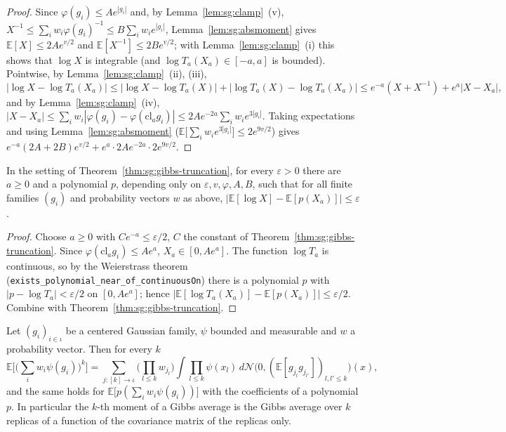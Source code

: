 \begin{proof}
  \leanok
Since $\varphi(g_i)\le Ae^{|g_i|}$ and, by Lemma~\ref{lem:sg:clamp}~(v), $X^{-1}\le\sum_iw_i\varphi(g_i)^{-1}\le B\sum_iw_ie^{|g_i|}$, Lemma~\ref{lem:sg:absmoment} gives
$\mathbb E[X]\le2Ae^{v/2}$ and $\mathbb E[X^{-1}]\le2Be^{v/2}$; with Lemma~\ref{lem:sg:clamp}~(i) this shows that $\log X$ is integrable (and $\log T_a(X_a)\in[-a,a]$ is bounded).
Pointwise, by Lemma~\ref{lem:sg:clamp}~(ii), (iii),
\[|\log X-\log T_a(X_a)|\le|\log X-\log T_a(X)|+|\log T_a(X)-\log T_a(X_a)|\le e^{-a}(X+X^{-1})+e^a|X-X_a|,\]
and by Lemma~\ref{lem:sg:clamp}~(iv), $|X-X_a|\le\sum_iw_i|\varphi(g_i)-\varphi(\mathrm{cl}_ag_i)|\le2Ae^{-2a}\sum_iw_ie^{3|g_i|}$. Taking expectations and using
Lemma~\ref{lem:sg:absmoment} ($\mathbb E\big[\sum_iw_ie^{3|g_i|}\big]\le2e^{9v/2}$) gives $e^{-a}(2A+2B)e^{v/2}+e^a\cdot2Ae^{-2a}\cdot2e^{9v/2}$.
\end{proof}

\begin{theorem}\label{thm:sg:poly}
  \leanok
In the setting of Theorem~\ref{thm:sg:gibbs-truncation}, for every $\varepsilon>0$ there are $a\ge0$ and a polynomial $p$, depending only on $\varepsilon,v,\varphi,A,B$, such that
for all finite families $(g_i)$ and probability vectors $w$ as above, $|\mathbb E[\log X]-\mathbb E[p(X_a)]|\le\varepsilon$.
\end{theorem}

\begin{proof}
  \leanok
Choose $a\ge0$ with $Ce^{-a}\le\varepsilon/2$, $C$ the constant of Theorem~\ref{thm:sg:gibbs-truncation}. Since $\varphi(\mathrm{cl}_ag_i)\le Ae^a$, $X_a\in[0,Ae^a]$. The function $\log T_a$ is continuous,
so by the Weierstrass theorem (\texttt{exists\_polynomial\_near\_of\_continuousOn}) there is a polynomial $p$ with $|p-\log T_a|<\varepsilon/2$ on $[0,Ae^a]$; hence
$|\mathbb E[\log T_a(X_a)]-\mathbb E[p(X_a)]|\le\varepsilon/2$. Combine with Theorem~\ref{thm:sg:gibbs-truncation}.
\end{proof}

\begin{theorem}\label{thm:sg:gibbs-replica}
  \leanok
Let $(g_i)_{i\in\iota}$ be a centered Gaussian family, $\psi$ bounded and measurable and $w$ a probability vector. Then for every $k$
\[\mathbb E\Big[\Big(\sum_iw_i\psi(g_i)\Big)^k\Big]=\sum_{j:[k]\to\iota}\Big(\prod_{l\le k}w_{j_l}\Big)\int\prod_{l\le k}\psi(x_l)\,d\mathcal N\big(0,(\mathbb E[g_{j_l}g_{j_{l'}}])_{l,l'\le k}\big)(x),\]
and the same holds for $\mathbb E\big[p(\sum_iw_i\psi(g_i))\big]$ with the coefficients of a polynomial $p$. In particular the $k$-th moment of a Gibbs average
is the Gibbs average over $k$ replicas of a function of the covariance matrix of the replicas only.
\end{theorem}

